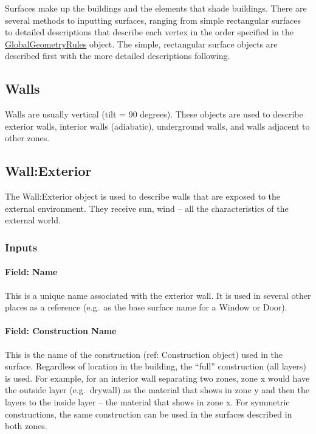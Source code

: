 Surfaces make up the buildings and the elements that shade buildings. There are several methods to inputting surfaces, ranging from simple rectangular surfaces to detailed descriptions that describe each vertex in the order specified in the \hyperref[globalgeometryrules]{GlobalGeometryRules} object. The simple, rectangular surface objects are described first with the more detailed descriptions following.

\subsection{Walls}\label{walls}

Walls are usually vertical (tilt = 90 degrees). These objects are used to describe exterior walls, interior walls (adiabatic), underground walls, and walls adjacent to other zones.

\subsection{Wall:Exterior}\label{wallexterior}

The Wall:Exterior object is used to describe walls that are exposed to the external environment. They receive sun, wind -- all the characteristics of the external world.

\subsubsection{Inputs}\label{inputs-4-035}

\paragraph{Field: Name}\label{field-name-047}

This is a unique name associated with the exterior wall. It is used in several other places as a reference (e.g.~as the base surface name for a Window or Door).

\paragraph{Field: Construction Name}\label{field-construction-name-003}

This is the name of the construction (ref: Construction object) used in the surface. Regardless of location in the building, the ``full'' construction (all layers) is used. For example, for an interior wall separating two zones, zone x would have the outside layer (e.g.~drywall) as the material that shows in zone y and then the layers to the inside layer -- the material that shows in zone x. For symmetric constructions, the same construction can be used in the surfaces described in both zones.

